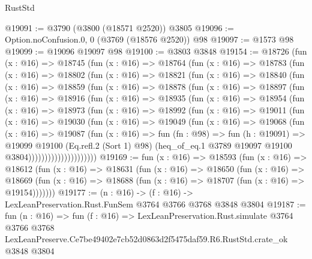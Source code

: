 \begin{lexlean}{RustStd}
\begin{coremodule}
@19091 := @3790 (@3800 (@18571 @2520)) @3805
@19096 := Option.noConfusion.{0, 0} (@3769 (@18576 @2520)) @98
@19097 := @1573 @98
@19099 := @19096 @19097 @98
@19100 := @3803 @3848
@19154 := @18726
    (fun (x : @16) =>
    @18745
      (fun (x : @16) =>
      @18764
        (fun (x : @16) =>
        @18783
          (fun (x : @16) =>
          @18802
            (fun (x : @16) =>
            @18821
              (fun (x : @16) =>
              @18840
                (fun (x : @16) =>
                @18859
                  (fun (x : @16) =>
                  @18878
                    (fun (x : @16) =>
                    @18897
                      (fun (x : @16) =>
                      @18916
                        (fun (x : @16) =>
                        @18935
                          (fun (x : @16) =>
                          @18954
                            (fun (x : @16) =>
                            @18973
                              (fun (x : @16) =>
                              @18992
                                (fun (x : @16) =>
                                @19011
                                  (fun (x : @16) =>
                                  @19030
                                    (fun (x : @16) =>
                                    @19049
                                      (fun (x : @16) =>
                                      @19068
                                        (fun (x : @16) =>
                                        @19087
                                          (fun (x : @16) =>
                                          fun (fn : @98) =>
                                          fun (h : @19091) =>
                                          @19099
                                            @19100
                                            (Eq.refl.{2} (Sort 1) @98)
                                            (heq_of_eq.{1}
                                              @3789
                                              @19097
                                              @19100
                                              @3804)))))))))))))))))))))
@19169 := fun (x : @16) =>
  @18593
    (fun (x : @16) =>
    @18612
      (fun (x : @16) =>
      @18631
        (fun (x : @16) =>
        @18650
          (fun (x : @16) =>
          @18669 (fun (x : @16) => @18688 (fun (x : @16) => @18707 (fun (x : @16) => @19154)))))))
@19177 := (n : @16) -> (f : @16) -> LexLeanPreservation.Rust.FunSem @3764 @3766 @3768 @3848 @3804
@19187 := fun (n : @16) =>
  fun (f : @16) =>
  LexLeanPreservation.Rust.simulate
    @3764
    @3766
    @3768
    LexLeanPreserve.Ce7be49402e7cb52d0863d2f5475daf59.R6.RustStd.crate_ok
    @3848
    @3804
\end{coremodule}
\end{lexlean}
